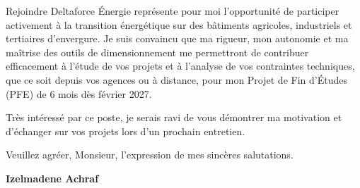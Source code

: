 \documentclass[10pt,a4paper]{altacv}
\begin{document}
\vspace{0.4cm}

Rejoindre Deltaforce Énergie représente pour moi l'opportunité de participer activement à la transition énergétique sur des bâtiments agricoles, industriels et tertiaires d'envergure. Je suis convaincu que ma rigueur, mon autonomie et ma maîtrise des outils de dimensionnement me permettront de contribuer efficacement à l'étude de vos projets et à l'analyse de vos contraintes techniques, que ce soit depuis vos agences ou à distance, pour mon Projet de Fin d'Études (PFE) de 6 mois dès février 2027.

\vspace{0.4cm}

Très intéressé par ce poste, je serais ravi de vous démontrer ma motivation et d'échanger sur vos projets lors d'un prochain entretien.

\vspace{0.5cm}

Veuillez agréer, Monsieur, l'expression de mes sincères salutations.

\vfill

\begin{flushright}
  \Large\color{emphasis}\textbf{Izelmadene Achraf}
\end{flushright}
\end{document}
